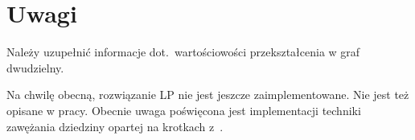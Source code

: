 \chapter{Uwagi}\label{section_notes}

\begin{note}
  Należy uzupełnić informacje dot.\ wartościowości przekształcenia w graf dwudzielny.
\end{note}
\begin{note}
  Na chwilę obecną, rozwiązanie LP nie jest jeszcze zaimplementowane.
  Nie jest też opisane w pracy.
  Obecnie uwaga poświęcona jest implementacji techniki zawężania dziedziny
  opartej na krotkach z~\cite{ImprovedBounds10}.
\end{note}
